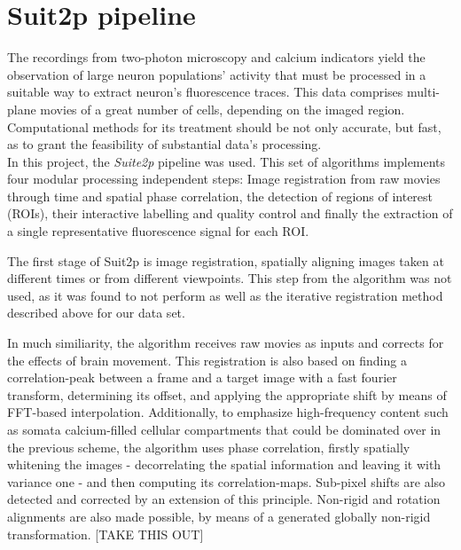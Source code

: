 \section{Suit2p pipeline}
\label{sec:Suit2ppipeline}


The recordings from two-photon microscopy and calcium indicators yield the observation of large neuron populations' activity that must be processed in a suitable way to extract neuron's fluorescence traces. This data comprises multi-plane movies of a great number of cells, depending on the imaged region. Computational methods for its treatment should be not only accurate, but fast, as to grant the feasibility of substantial data's processing. 
\\In this project, the \textit{Suite2p} pipeline was used. This set of algorithms implements four modular processing independent steps: Image registration from raw movies through time and spatial phase correlation, the detection of regions of interest (ROIs), their interactive labelling and quality control and finally the extraction of a single representative fluorescence signal for each ROI.

The first stage of Suit2p is image registration, spatially aligning images taken at different times or from different viewpoints. This step from the algorithm was not used, as it was found to not perform as well as the iterative registration method described above for our data set. 

In much similiarity, the algorithm receives raw movies as inputs and corrects for the effects of brain movement. 
This registration is also based on finding a correlation-peak between a frame and a target image with a fast fourier transform, determining its offset, and applying the appropriate shift by means of FFT-based interpolation.
Additionally, to emphasize high-frequency content such as somata calcium-filled cellular compartments that could be dominated over in the previous scheme, the algorithm uses phase correlation, firstly spatially whitening the images - decorrelating the spatial information and leaving it with variance one - and then computing its correlation-maps. Sub-pixel shifts are also detected and corrected by an extension of this principle.
Non-rigid and rotation alignments are also made possible, by means of a generated globally non-rigid transformation. [TAKE THIS OUT]

